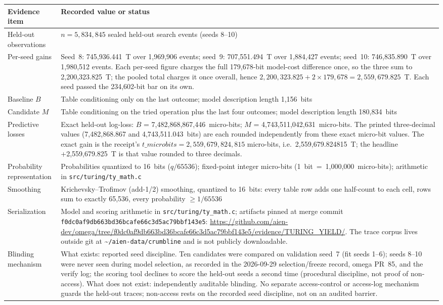 \documentclass[11pt]{article}
\begin{document}
\begin{table}[h]
\centering
\small
\setlength{\tabcolsep}{4pt}
\begin{tabularx}{\textwidth}{lY}
\toprule
\textbf{Evidence item} & \textbf{Recorded value or status} \\
\midrule
Held-out observations & \(n = 5{,}834{,}845\) sealed held-out search events (seeds 8--10) \\
Per-seed gains & Seed~8: 745,936.441~T over 1,969,906 events; seed~9: 707,551.494~T over 1,884,427 events; seed~10: 746,835.890~T over 1,980,512 events. Each per-seed figure charges the full 179,678-bit model-cost difference once, so the three sum to 2,200,323.825~T; the pooled total charges it once overall, hence \(2{,}200{,}323.825 + 2 \times 179{,}678 = 2{,}559{,}679.825\)~T. Each seed passed the 234,602-bit bar on its own. \\
Baseline \(B\) & Table conditioning only on the last outcome; model description length 1,156~bits \\
Candidate \(M\) & Table conditioning on the tried operation plus the last four outcomes; model description length 180,834~bits \\
Predictive losses & Exact held-out log-loss: \(B\) = 7,482,868,867,446~micro-bits; \(M\) = 4,743,511,042,631~micro-bits. The printed three-decimal values (7,482,868.867 and 4,743,511.043~bits) are each rounded independently from these exact micro-bit values. The exact gain is the receipt's \(t\_microbits = 2{,}559{,}679{,}824{,}815\) micro-bits, i.e.\ 2,559,679.824815~T; the headline +2,559,679.825~T is that value rounded to three decimals. \\
Probability representation & Probabilities quantized to 16~bits (\(q/65536\)); fixed-point integer micro-bits (1~bit~=~1,000,000~micro-bits); arithmetic in \texttt{src/turing/ty\_math.c} \\
Smoothing & Krichevsky--Trofimov (add-1/2) smoothing, quantized to 16~bits: every table row adds one half-count to each cell, rows sum to exactly 65,536, every probability \(\geq 1/65536\) \\
Serialization & Model and scoring arithmetic in \texttt{src/turing/ty\_math.c}; artifacts pinned at merge commit \texttt{f0dc0af9db663bd36bcafe66c3d5ac79bbf143e5}: \url{https://github.com/aien-dev/omega/tree/f0dc0af9db663bd36bcafe66c3d5ac79bbf143e5/evidence/TURING_YIELD/}. The trace corpus lives outside git at \textasciitilde\texttt{/aien-data/crumbline} and is not publicly downloadable. \\
Blinding mechanism & What exists: reported seed discipline. Ten candidates were compared on validation seed~7 (fit seeds 1--6); seeds 8--10 were never seen during model selection, as recorded in the 2026-09-29 selection/freeze record, omega PR~85, and the verify log; the scoring tool declines to score the held-out seeds a second time (procedural discipline, not proof of non-access). What does not exist: independently auditable blinding. No separate access-control or access-log mechanism guards the held-out traces; non-access rests on the recorded seed discipline, not on an audited barrier. \\

\end{tabularx}
\end{table}
\end{document}
